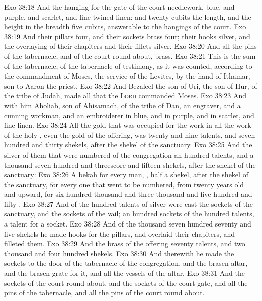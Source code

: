 \vs Exo 38:18 And the hanging for the gate of the court  needlework,  blue, and purple, and scarlet, and fine twined linen: and twenty cubits  the length, and the height in the breadth  five cubits, answerable to the hangings of the court.
\vs Exo 38:19 And their pillars  four, and their sockets  brass four; their hooks  silver, and the overlaying of their chapiters and their fillets  silver.
\vs Exo 38:20 And all the pins of the tabernacle, and of the court round about,  brass.
\vs Exo 38:21 This is the sum of the tabernacle,  of the tabernacle of testimony, as it was counted, according to the commandment of Moses,  the service of the Levites, by the hand of Ithamar, son to Aaron the priest.
\vs Exo 38:22 And Bezaleel the son of Uri, the son of Hur, of the tribe of Judah, made all that the \textsc{Lord} commanded Moses.
\vs Exo 38:23 And with him  Aholiab, son of Ahisamach, of the tribe of Dan, an engraver, and a cunning workman, and an embroiderer in blue, and in purple, and in scarlet, and fine linen.
\vs Exo 38:24 All the gold that was occupied for the work in all the work of the holy , even the gold of the offering, was twenty and nine talents, and seven hundred and thirty shekels, after the shekel of the sanctuary.
\vs Exo 38:25 And the silver of them that were numbered of the congregation  an hundred talents, and a thousand seven hundred and threescore and fifteen shekels, after the shekel of the sanctuary:
\vs Exo 38:26 A bekah for every man, , half a shekel, after the shekel of the sanctuary, for every one that went to be numbered, from twenty years old and upward, for six hundred thousand and three thousand and five hundred and fifty .
\vs Exo 38:27 And of the hundred talents of silver were cast the sockets of the sanctuary, and the sockets of the vail; an hundred sockets of the hundred talents, a talent for a socket.
\vs Exo 38:28 And of the thousand seven hundred seventy and five shekels he made hooks for the pillars, and overlaid their chapiters, and filleted them.
\vs Exo 38:29 And the brass of the offering  seventy talents, and two thousand and four hundred shekels.
\vs Exo 38:30 And therewith he made the sockets to the door of the tabernacle of the congregation, and the brasen altar, and the brasen grate for it, and all the vessels of the altar,
\vs Exo 38:31 And the sockets of the court round about, and the sockets of the court gate, and all the pins of the tabernacle, and all the pins of the court round about.
